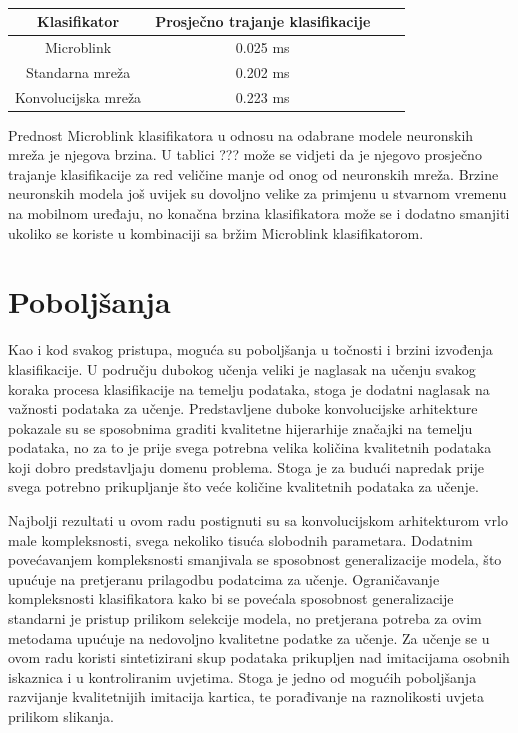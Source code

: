 \documentclass[lmodern, utf8, diplomski, numeric]{fer}
\begin{document}
\begin{table}[ht!]
\begin{center}
\centering
    \begin{tabular}{ | c| c| c|c |}
    \hline    		
    Klasifikator & Prosječno trajanje klasifikacije \\ \hline
    Microblink & 0.025 ms \\ \hline
    Standarna mreža & 0.202 ms  \\ \hline
    Konvolucijska mreža &  0.223 ms \\
    \hline
    \end{tabular} 
\end{center}
\caption{}
\end{table}

Prednost Microblink klasifikatora u odnosu na odabrane modele neuronskih mreža je njegova brzina. U tablici ??? može se vidjeti da je njegovo prosječno trajanje klasifikacije za red veličine manje od onog od neuronskih mreža. Brzine neuronskih modela još uvijek su dovoljno velike za primjenu u stvarnom vremenu na mobilnom uređaju, no konačna brzina klasifikatora može se i dodatno smanjiti ukoliko se koriste u kombinaciji sa bržim Microblink klasifikatorom. 

\section{Poboljšanja}
 
Kao i kod svakog pristupa, moguća su poboljšanja u točnosti i brzini izvođenja klasifikacije. U području dubokog učenja veliki je naglasak na učenju svakog koraka procesa klasifikacije na temelju podataka, stoga je dodatni naglasak na važnosti podataka za učenje. Predstavljene duboke konvolucijske arhitekture pokazale su se sposobnima graditi kvalitetne hijerarhije značajki na temelju podataka, no za to je prije svega potrebna velika količina kvalitetnih podataka koji dobro predstavljaju domenu problema. Stoga je za budući napredak prije svega potrebno prikupljanje što veće količine kvalitetnih podataka za učenje. 

Najbolji rezultati u ovom radu postignuti su sa konvolucijskom arhitekturom vrlo male kompleksnosti, svega nekoliko tisuća slobodnih parametara. Dodatnim povećavanjem kompleksnosti smanjivala se sposobnost generalizacije modela, što upućuje na pretjeranu prilagodbu podatcima za učenje. Ograničavanje kompleksnosti klasifikatora kako bi se povećala sposobnost generalizacije standarni je pristup prilikom selekcije modela, no pretjerana potreba za ovim metodama upućuje na nedovoljno kvalitetne podatke za učenje. Za učenje se u ovom radu koristi sintetizirani skup podataka prikupljen nad imitacijama osobnih iskaznica i u kontroliranim uvjetima. Stoga je jedno od mogućih poboljšanja razvijanje kvalitetnijih imitacija kartica, te porađivanje na raznolikosti uvjeta prilikom slikanja.
\end{document}
